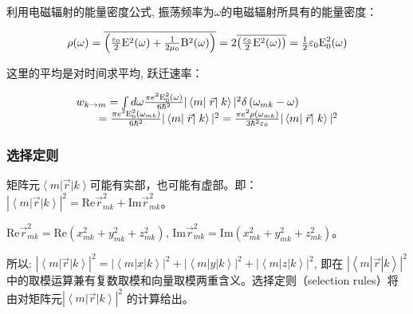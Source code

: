 利用电磁辐射的能量密度公式,
振荡频率为$\omega$的电磁辐射所具有的能量密度：

\begin{equation}\label{25-8}
\rho (\omega ) = \overline {\left( {{\textstyle{{\varepsilon _0 } \over 2}}{\rm E}^2 (\omega ) + {\textstyle{1 \over {2\mu _0 }}}{\rm B}^2 (\omega )} \right)}  = 2\overline {\left( {{\textstyle{{\varepsilon _0 } \over 2}}{\rm E}^2 (\omega )} \right)}  = {\textstyle{1 \over 2}}\varepsilon _0 {\rm E}_0^2 (\omega )
\end{equation}

这里的平均是对时间求平均, 跃迁速率：

\begin{equation}\label{25-9}
\begin{array}{l}
w_{k \to m}  = \int {d\omega \frac{{\pi e^2 {\rm E}_0^2 (\omega
)}}{{6\hbar ^2 }} | \left\langle m \right|\left. {\vec r}
\right|\left. k \right\rangle |^2 \delta \left( {\omega _{mk}  -
\omega } \right)} \\
\qquad  = \frac{{\pi e^2 {\rm E}_0^2 (\omega _{mk}
)}}{{6\hbar ^2 }} | \left\langle m \right|\left. {\vec r}
\right|\left. k \right\rangle |^2 = \frac{{\pi e^2 \rho (\omega _{mk} )}}{{3\hbar ^2 \varepsilon _0 }}
| \left\langle m \right|\left. {\vec r} \right|\left. k
\right\rangle |^2 \\
\end{array}
\end{equation}

\subsubsection{选择定则}


矩阵元${\left\langle {m} \right|\vec r\left| k \right\rangle
}$可能有实部，也可能有虚部。即：$\left| {\left\langle {m}
\right|\vec r\left| k \right\rangle } \right|^2 = \text{Re}
\vec{r}_{mk}^2 + \text{Im} \vec{r}_{mk}^2$。

$\text{Re} \vec{r}_{mk}^2 = \text{Re} (x_{mk}^2 + y_{mk}^2 +
z_{mk}^2)$,  $\text{Im} \vec{r}_{mk}^2 = \text{Im} (x_{mk}^2 +
y_{mk}^2 + z_{mk}^2)$。

所以: $\left| {\left\langle {m} \right|\vec r\left| k \right\rangle
} \right|^2 = |\left<m|x|k\right>|^2 + |\left<m|y|k\right>|^2 +
|\left<m|z|k\right>|^2$, 即在 $|\left<m|\vec{r}|k\right>|^2$
中的取模运算兼有复数取模和向量取模两重含义。选择定则（selection
rules）将由对矩阵元$\left| {\left\langle {m} \right|\vec r\left| k
\right\rangle } \right|^2$ 的计算给出。

